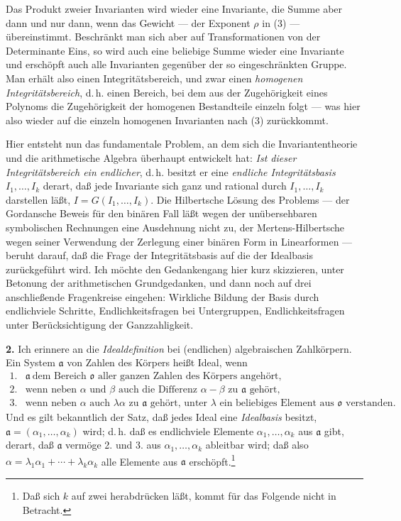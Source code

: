 \documentclass[11pt]{article}
\providecommand{\mo}{\mathfrak o}
\providecommand{\ma}{\mathfrak a}
\begin{document}
Das Produkt zweier Invarianten wird wieder eine Invariante, die Summe aber dann und nur dann, wenn das Gewicht --- der Exponent $\rho$ in (3) --- übereinstimmt. Beschränkt man sich aber auf Transformationen von der Determinante Eins, so wird auch eine beliebige Summe wieder eine Invariante und erschöpft auch alle Invarianten gegenüber der so eingeschränkten Gruppe. Man erhält also einen Integritätsbereich, und zwar einen \emph{homogenen Integritätsbereich}, d.\,h. einen Bereich, bei dem aus der Zugehörigkeit eines Polynoms die Zugehörigkeit der homogenen Bestandteile einzeln folgt --- was hier also wieder auf die einzeln homogenen Invarianten nach (3) zurückkommt.

Hier entsteht nun das fundamentale Problem, an dem sich die Invariantentheorie und die arithmetische Algebra überhaupt entwickelt hat: \emph{Ist dieser Integritätsbereich ein endlicher}, d.\,h. besitzt er eine \emph{endliche Integritätsbasis} $I_1,\ldots,I_k$ derart, daß jede Invariante sich ganz und rational durch $I_1,\ldots,I_k$ darstellen läßt, $I=G(I_1,\ldots,I_k)$. Die Hilbertsche Lösung des Problems --- der Gordansche Beweis für den binären Fall läßt wegen der unübersehbaren symbolischen Rechnungen eine Ausdehnung nicht zu, der Mertens-Hilbertsche wegen seiner Verwendung der Zerlegung einer binären Form in Linearformen --- beruht darauf, daß die Frage der Integritätsbasis auf die der Idealbasis zurückgeführt wird. Ich möchte den Gedankengang hier kurz skizzieren, unter Betonung der arithmetischen Grundgedanken, und dann noch auf drei anschließende Fragenkreise eingehen: Wirkliche Bildung der Basis durch endlichviele Schritte, Endlichkeitsfragen bei Untergruppen, Endlichkeitsfragen unter Berücksichtigung der Ganzzahligkeit.

\textbf{2.} Ich erinnere an die \emph{Idealdefinition} bei (endlichen) algebraischen Zahlkörpern. Ein System $\ma$ von Zahlen des Körpers heißt Ideal, wenn
\[
\begin{array}{ll}
1.& \ma\ \text{dem Bereich }\mo\text{ aller ganzen Zahlen des Körpers angehört},\\
2.& \text{wenn neben }\alpha\text{ und }\beta\text{ auch die Differenz }\alpha-\beta\text{ zu }\ma\text{ gehört},\\
3.& \text{wenn neben }\alpha\text{ auch }\lambda\alpha\text{ zu }\ma\text{ gehört, unter }\lambda\text{ ein beliebiges Element aus }\mo\text{ verstanden.}
\end{array}
\]
Und es gilt bekanntlich der Satz, daß jedes Ideal eine \emph{Idealbasis} besitzt, $\ma=(\alpha_1,\ldots,\alpha_k)$ wird; d.\,h. daß es endlichviele Elemente $\alpha_1,\ldots,\alpha_k$ aus $\ma$ gibt, derart, daß $\ma$ vermöge 2. und 3. aus $\alpha_1,\ldots,\alpha_k$ ableitbar wird; daß also $\alpha=\lambda_1\alpha_1+\cdots+\lambda_k\alpha_k$ alle Elemente aus $\ma$ erschöpft.\footnote{Daß sich $k$ auf zwei herabdrücken läßt, kommt für das Folgende nicht in Betracht.}
\end{document}
